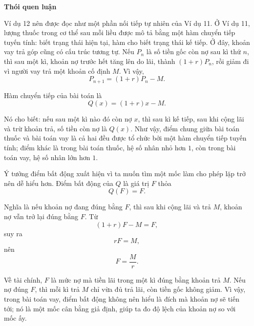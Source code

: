 {\begin{hanglist}
    \end{hanglist}

    \textbf{Thói quen luận}

    \begin{hanglist}


    \end{hanglist}
  }
  {
    \vspace{.5\baselineskip}
    Ví dụ 12 nên được đọc như một phần nối tiếp tự nhiên của Ví dụ 11. Ở Ví dụ 11, lượng thuốc trong cơ thể sau mỗi liều được mô tả bằng một hàm chuyển tiếp tuyến tính: biết trạng thái hiện tại, hàm cho biết trạng thái kế tiếp. Ở đây, khoản vay trả góp cũng có cấu trúc tương tự. Nếu $P_n$ là số tiền gốc còn nợ sau kì thứ $n$, thì sau một kì, khoản nợ trước hết tăng lên do lãi, thành $(1+r)P_n$, rồi giảm đi vì người vay trả một khoản cố định $M$. Vì vậy,
    $$
    P_{n+1}=(1+r)P_n-M.
    $$

    Hàm chuyển tiếp của bài toán là
    $$
    Q(x)=(1+r)x-M.
    $$

    Nó cho biết: nếu sau một kì nào đó còn nợ $x$, thì sau kì kế tiếp, sau khi cộng lãi và trừ khoản trả, số tiền còn nợ là $Q(x)$. Như vậy, điểm chung giữa bài toán thuốc và bài toán vay là cả hai đều được tổ chức bởi một hàm chuyển tiếp tuyến tính; điểm khác là trong bài toán thuốc, hệ số nhân nhỏ hơn $1$, còn trong bài toán vay, hệ số nhân lớn hơn $1$.

    Ý tưởng điểm bất động xuất hiện vì ta muốn tìm một mốc làm cho phép lặp trở nên dễ hiểu hơn. Điểm bất động của $Q$ là giá trị $F$ thỏa
    $$
    Q(F)=F.
    $$

    Nghĩa là nếu khoản nợ đang đúng bằng $F$, thì sau khi cộng lãi và trả $M$, khoản nợ vẫn trở lại đúng bằng $F$. Từ
    $$
    (1+r)F-M=F,
    $$
    suy ra
    $$
    rF=M,
    $$
    nên
    $$
    F=\frac{M}{r}.
    $$
    
    Về tài chính, $F$ là mức nợ mà tiền lãi trong một kì đúng bằng khoản trả $M$. Nếu nợ đúng $F$, thì mỗi kì trả $M$ chỉ vừa đủ trả lãi, còn tiền gốc không giảm. Vì vậy, trong bài toán vay, điểm bất động không nên hiểu là đích mà khoản nợ sẽ tiến tới; nó là một mốc cân bằng giả định, giúp ta đo độ lệch của khoản nợ so với mốc ấy.

}
